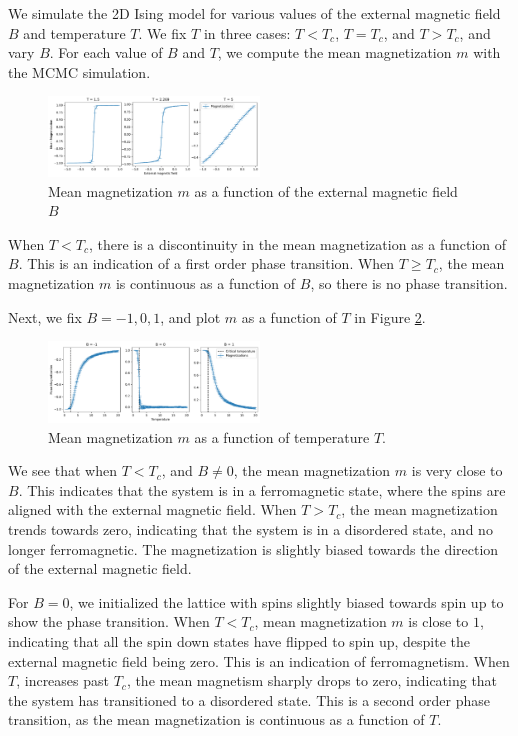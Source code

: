 \documentclass[
 reprint,
 amsmath,
 amssymb,
 aps,
]{revtex4-2}
\begin{document}
We simulate the 2D Ising model for various values of the external magnetic
field $ B $ and temperature $ T $.
We fix $ T $ in three cases: $ T < T_{c} $, $ T=T_{c} $, and $ T > T_{c} $,
and vary $ B $.
For each value of $ B $ and $ T $,
we compute the mean magnetization $ m $ with the MCMC simulation.

\begin{figure}[ht]
\centering
\includegraphics[width=0.5\textwidth]{figures/m_vs_B.pdf}
\caption{Mean magnetization $ m $ as a function of the external magnetic 
field $ B $}
\label{fig:m_vs_B}
\end{figure}

When $ T < T_{c} $, there is a discontinuity in the mean magnetization
as a function of $ B $.
This is an indication of a first order phase transition.
When $ T \geq T_{c} $,
the mean magnetization $ m $ is continuous as a function of $ B $,
so there is no phase transition.

Next, we fix $ B = -1, 0, 1 $, and plot $ m $ as a function of $ T $
in Figure \ref{fig:m_vs_T}.
\begin{figure}[ht]
\centering
\includegraphics[width=0.5\textwidth]{figures/m_vs_T.pdf}
\caption{Mean magnetization $ m $ as a function of temperature $ T $.}
\label{fig:m_vs_T}
\end{figure}
We see that when $ T < T_{c} $,
and $ B\neq 0 $,
the mean magnetization $ m $ is very close to $ B $.
This indicates that the system is in a ferromagnetic state,
where the spins are aligned with the external magnetic field.
When $ T > T_{c} $,
the mean magnetization trends towards zero,
indicating that the system is in a disordered state,
and no longer ferromagnetic.
The magnetization is slightly biased towards the direction of the external
magnetic field.

For $ B = 0 $, we initialized the lattice with spins slightly biased towards
spin up to show the phase transition.
When $ T < T_{c} $,
mean magnetization $ m $ is close to $ 1 $,
indicating that all the spin down states have flipped to spin up,
despite the external magnetic field being zero.
This is an indication of ferromagnetism.
When $ T $, increases past $ T_{c} $,
the mean magnetism sharply drops to zero,
indicating that the system has transitioned to a disordered state.
This is a second order phase transition, as the mean magnetization
is continuous as a function of $ T $.
\end{document}

